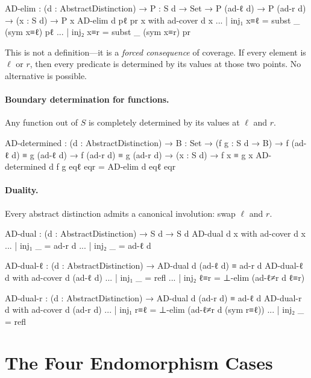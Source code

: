 \documentclass[11pt,a4paper]{book}
\begin{document}
\begin{code}
AD-elim : (d : AbstractDistinction) →
          {P : S d → Set} →
          P (ad-ℓ d) → P (ad-r d) →
          (x : S d) → P x
AD-elim d pℓ pr x with ad-cover d x
... | inj₁ x≡ℓ = subst _ (sym x≡ℓ) pℓ
... | inj₂ x≡r = subst _ (sym x≡r) pr
\end{code}

This is not a definition—it is a \emph{forced consequence} of coverage. If every
element is $\ell$ or $r$, then every predicate is determined by its values at those
two points. No alternative is possible.

\paragraph{Boundary determination for functions.}
Any function out of $S$ is completely determined by its values at $\ell$ and $r$.

\begin{code}
AD-determined : (d : AbstractDistinction) →
                {B : Set} →
                (f g : S d → B) →
                f (ad-ℓ d) ≡ g (ad-ℓ d) →
                f (ad-r d) ≡ g (ad-r d) →
                (x : S d) → f x ≡ g x
AD-determined d f g eqℓ eqr = AD-elim d eqℓ eqr
\end{code}

\paragraph{Duality.}
Every abstract distinction admits a canonical involution: swap $\ell$ and $r$.

\begin{code}
AD-dual : (d : AbstractDistinction) → S d → S d
AD-dual d x with ad-cover d x
... | inj₁ _ = ad-r d
... | inj₂ _ = ad-ℓ d

AD-dual-ℓ : (d : AbstractDistinction) → AD-dual d (ad-ℓ d) ≡ ad-r d
AD-dual-ℓ d with ad-cover d (ad-ℓ d)
... | inj₁ _   = refl
... | inj₂ ℓ≡r = ⊥-elim (ad-ℓ≠r d ℓ≡r)

AD-dual-r : (d : AbstractDistinction) → AD-dual d (ad-r d) ≡ ad-ℓ d
AD-dual-r d with ad-cover d (ad-r d)
... | inj₁ r≡ℓ = ⊥-elim (ad-ℓ≠r d (sym r≡ℓ))
... | inj₂ _   = refl
\end{code}

\section{The Four Endomorphism Cases}
\label{sec:endocase}
\end{document}
